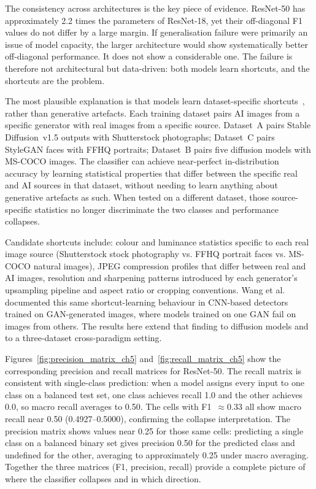 The consistency across architectures is the key piece of evidence. ResNet-50 has
approximately 2.2 times the parameters of ResNet-18, yet their off-diagonal F1 values
do not differ by a large margin. If generalisation failure were primarily
an issue of model capacity, the larger architecture would show systematically better
off-diagonal performance. It does not show a considerable one. The failure is therefore not architectural but
data-driven: both models learn shortcuts, and the shortcuts are the problem.

The most plausible explanation is that models learn dataset-specific shortcuts~\cite{geirhos2020shortcut}, rather
than generative artefacts. Each training dataset pairs AI images from a specific generator
with real images from a specific source. Dataset~A pairs Stable Diffusion~v1.5 outputs
with Shutterstock photographs; Dataset~C pairs StyleGAN faces with FFHQ portraits;
Dataset~B pairs five diffusion models with MS-COCO images. The classifier can achieve
near-perfect in-distribution accuracy by learning statistical properties that differ
between the specific real and AI sources in that dataset, without needing to learn anything
about generative artefacts as such. When tested on a different dataset, those
source-specific statistics no longer discriminate the two classes and performance
collapses.

Candidate shortcuts include: colour and luminance statistics specific to each real image
source (Shutterstock stock photography vs. FFHQ portrait faces vs. MS-COCO natural
images), JPEG compression profiles that differ between real and AI images, resolution
and sharpening patterns introduced by each generator's upsampling pipeline and aspect
ratio or cropping conventions. Wang et al.~\cite{wang2020} documented this same
shortcut-learning behaviour in CNN-based detectors trained on GAN-generated images, where
models trained on one GAN fail on images from others. The results here extend that
finding to diffusion models and to a three-dataset cross-paradigm setting.

Figures~\ref{fig:precision_matrix_ch5} and~\ref{fig:recall_matrix_ch5} show the
corresponding precision and recall matrices for ResNet-50. The recall matrix is
consistent with single-class prediction: when a model assigns every input to one class
on a balanced test set, one class achieves recall 1.0 and the other achieves 0.0, so
macro recall averages to 0.50. The cells with F1~$\approx 0.33$ all show macro recall near
0.50 (0.4927--0.5000), confirming the collapse interpretation. The precision matrix
shows values near 0.25 for those same cells: predicting a single class on a balanced
binary set gives precision 0.50 for the predicted class and undefined for the other,
averaging to approximately 0.25 under macro averaging. Together the three matrices
(F1, precision, recall) provide a complete picture of where the classifier collapses
and in which direction.

